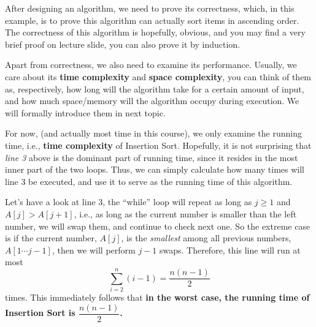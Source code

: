 \begin{spacing}{1.3}
\begin{algorithm*}[htbp]

    \end{algorithm*}

    After designing an algorithm, we need to prove its correctness, which, in this example,
    is to prove this algorithm can actually sort items in ascending order.
    The correctness of this algorithm is hopefully, obvious, and you may find a 
    very brief proof on lecture slide, you can also prove it by induction.

    Apart from correctness, we also need to examine its performance.
    Usually, we care about its {\bf time complexity} and {\bf space complexity},
    you can think of them as, respectively, how long will the algorithm take 
    for a certain amount of input, and how much space/memory will the algorithm occupy
    during execution. We will formally introduce them in next topic.

    For now, (and actually most time in this course), we only examine the running time, i.e., 
    {\bf time complexity} of Insertion Sort. Hopefully, it is not surprising that 
    {\it line 3} above is the dominant part of running time, since it resides in the 
    most inner part of the two loops. Thus, we can simply calculate how many times 
    will line 3 be executed, and use it to serve as the running time of this algorithm.

    Let's have a look at line 3, the ``while'' loop will repeat as long as 
    $j\ge 1$ and $A[j]>A[j+1]$, i.e., as long as the current number is smaller than 
    the left number, we will swap them, and continue to check next one.
    So the extreme case is if the current number, $A[j]$, is the {\it smallest} among 
    all previous numbers, $A[1\cdots j-1]$, then we will perform $j-1$ swaps.
    Therefore, this line will run at most
    $$\sum_{i=2}^{n}(i-1)=\frac{n(n-1)}{2}$$
    times. This immediately follows that {\bf in the worst case, the running time of 
    Insertion Sort is $\dfrac{n(n-1)}{2}$.}


\end{spacing}

